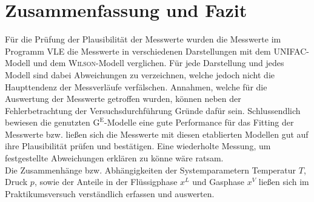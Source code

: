\section{Zusammenfassung und Fazit}
\label{sec:zusammenfassung}

Für die Prüfung der Plausibilität der Messwerte wurden die Messwerte im Programm \textsc{VLE} die Messwerte in verschiedenen Darstellungen mit dem \textsc{UNIFAC}-Modell und dem \textsc{Wilson}-Modell verglichen. Für jede Darstellung und jedes Modell sind dabei Abweichungen zu verzeichnen, welche jedoch nicht die Haupttendenz der Messverläufe verfälschen. Annahmen, welche für die Auswertung der Messwerte getroffen wurden, können neben der Fehlerbetrachtung der Versuchsdurchführung Gründe dafür sein. Schlussendlich bewiesen die  genutzten $\text{G}^{\text{E}}$-Modelle eine gute Performance für das Fitting der Messwerte bzw. ließen sich die Messwerte mit diesen etablierten Modellen gut auf ihre Plausibilität prüfen und bestätigen. Eine wiederholte Messung, um festgestellte Abweichungen erklären zu könne wäre ratsam.\\
Die Zusammenhänge bzw. Abhängigkeiten der Systemparametern Temperatur $T$, Druck $p$, sowie der Anteile in der Flüssigphase $x^L$ und Gasphase $x^V$ ließen sich im Praktikumsversuch verständlich erfassen und auswerten.